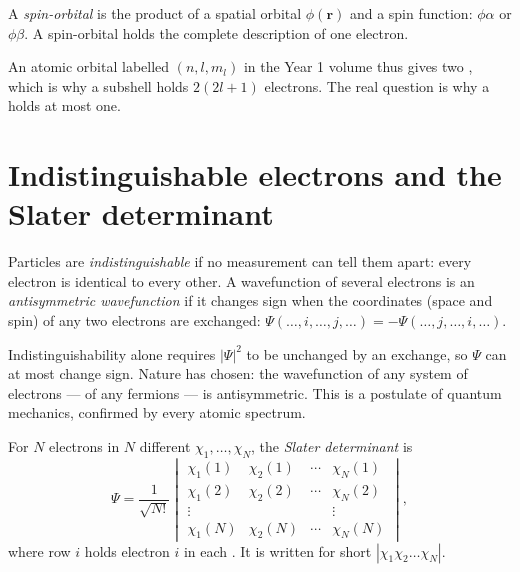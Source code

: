 \begin{definition}\label{def:b3:many-electron-atoms:spin-orbital}
A \emph{spin-orbital} is the product of a spatial orbital
$\phi(\mathbf r)$ and a spin function: $\phi\alpha$ or $\phi\beta$. A
spin-orbital holds the complete description of one electron.
\end{definition}

An atomic orbital labelled $(n, l, m_l)$ in the Year 1 volume thus gives two
, which is why a subshell holds $2(2l+1)$ electrons. The real
question is why a  holds at most one.

\section{Indistinguishable electrons and the Slater determinant}

\begin{definition}\label{def:b3:many-electron-atoms:indistinguishable}
Particles are \emph{indistinguishable} if
no measurement can tell them apart: every electron is identical to every
other. A wavefunction of several electrons is an \emph{antisymmetric
wavefunction} if it changes sign when the
coordinates (space and spin) of any two electrons are exchanged:
$\Psi(\dots,i,\dots,j,\dots) = -\Psi(\dots,j,\dots,i,\dots)$.
\end{definition}

Indistinguishability alone requires $|\Psi|^2$ to be unchanged by an
exchange, so $\Psi$ can at most change sign. Nature has chosen: the
wavefunction of any system of electrons --- of any fermions --- is
antisymmetric. This is a postulate of quantum mechanics, confirmed by every
atomic spectrum.

\begin{definition}\label{def:b3:many-electron-atoms:slater}
For $N$ electrons in $N$ different  $\chi_1, \dots, \chi_N$, the
\emph{Slater determinant} is
\[
\Psi = \frac{1}{\sqrt{N!}}\begin{vmatrix}
\chi_1(1) & \chi_2(1) & \cdots & \chi_N(1)\\
\chi_1(2) & \chi_2(2) & \cdots & \chi_N(2)\\
\vdots & & & \vdots\\
\chi_1(N) & \chi_2(N) & \cdots & \chi_N(N)
\end{vmatrix},
\]
where row $i$ holds electron $i$ in each . It is written for short
$|\chi_1\chi_2\dots\chi_N|$.
\end{definition}


